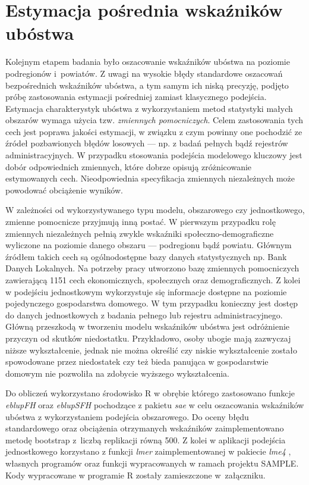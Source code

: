 \section{Estymacja pośrednia wskaźników ubóstwa}

Kolejnym etapem badania było oszacowanie wskaźników ubóstwa na poziomie podregionów i~powiatów. Z uwagi na wysokie błędy standardowe oszacowań bezpośrednich wskaźników ubóstwa, a tym samym ich niską precyzję, podjęto próbę zastosowania estymacji pośredniej zamiast klasycznego podejścia. Estymacja charakterystyk ubóstwa z wykorzystaniem metod statystyki małych obszarów wymaga użycia tzw. \textit{zmiennych pomocniczych}. Celem zastosowania tych cech jest poprawa jakości estymacji, w związku z czym powinny one pochodzić ze źródeł pozbawionych błędów losowych --- np. z badań pełnych bądź rejestrów administracyjnych. W przypadku stosowania podejścia modelowego kluczowy jest dobór odpowiednich zmiennych, które dobrze opisują zróżnicowanie estymowanych cech. Nieodpowiednia specyfikacja zmiennych niezależnych może powodować obciążenie wyników.

W zależności od wykorzystywanego typu modelu, obszarowego czy jednostkowego, zmienne pomocnicze przyjmują inną postać. W pierwszym przypadku rolę zmiennych niezależnych pełnią zwykle wskaźniki społeczno-demograficzne wyliczone na poziomie danego obszaru --- podregionu bądź powiatu. Głównym źródłem takich cech są ogólnodostępne bazy danych statystycznych np. Bank Danych Lokalnych. Na potrzeby pracy utworzono bazę zmiennych pomocniczych zawierającą 1151 cech ekonomicznych, społecznych oraz demograficznych. Z kolei w podejściu jednostkowym wykorzystuje się informacje dostępne na poziomie pojedynczego gospodarstwa domowego. W tym przypadku konieczny jest dostęp do danych jednostkowych z badania pełnego lub rejestru administracyjnego. Główną przeszkodą w tworzeniu modelu wskaźników ubóstwa jest odróżnienie przyczyn od skutków niedostatku. Przykładowo, osoby ubogie mają zazwyczaj niższe wykształcenie, jednak nie można określić czy niskie wykształcenie zostało spowodowane przez niedostatek czy też bieda panująca w gospodarstwie domowym nie pozwoliła na zdobycie wyższego wykształcenia.

Do obliczeń wykorzystano środowisko R \citep{r2016} w obrębie którego zastosowano funkcje \emph{eblupFH} oraz \emph{eblupSFH} pochodzące z pakietu \emph{sae} \citep{molina-marhuenda2015} w celu oszacowania wskaźników ubóstwa z wykorzystaniem podejścia obszarowego. Do oceny błędu standardowego oraz obciążenia otrzymanych wskaźników zaimplementowano metodę bootstrap z~liczbą replikacji równą 500. Z kolei w aplikacji podejścia jednostkowego korzystano z funkcji \emph{lmer} zaimplementowanej w pakiecie \emph{lme4} \citep{lme42015}, własnych programów oraz funkcji wypracowanych w ramach projektu SAMPLE. Kody wypracowane w programie R zostały zamieszczone w~załączniku.

